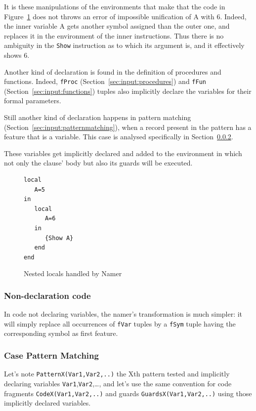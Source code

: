 \documentclass[a4paper]{memoir}
\begin{document}
It is these manipulations of the environments that make that the code in
Figure~\ref{fig:namer_nested_locals} does not throws an error of impossible
unification of A with 6. Indeed, the inner variable A gets another symbol
assigned than the outer one, and replaces it in the environment of the inner
instructions. Thus there is no ambiguity in the \lstinline!Show! instruction as
to which its argument is, and it effectively shows 6.

Another kind of declaration is found in the definition of procedures and
functions. Indeed, \lstinline!fProc! (Section~\ref{sec:input:procedures}) and
\lstinline!fFun! (Section~\ref{sec:input:functions}) tuples also implicitly
declare the variables for their formal parameters. %

Still another kind of declaration happens in pattern matching
(Section~\ref{sec:input:patternmatching}), when a record present in the pattern
has a feature that is a variable. This case is analysed specifically in
Section~\ref{sec:arch:namer:patternmatching}.

These variables get implicitly declared and added to the environment in which not only the clause' body but also its guards will be executed.


\begin{figure}
\begin{lstlisting}
local
   A=5
in
   local 
      A=6
   in
      {Show A}
   end
end
\end{lstlisting}
\caption{Nested locals handled by Namer}
\label{fig:namer_nested_locals}
\end{figure}


\subsubsection{Non-declaration code}
In code not declaring variables, the namer's transformation is much simpler: it will simply
replace all occurrences of \lstinline!fVar! tuples by a \lstinline!fSym! tuple having the corresponding symbol as first feature.


\subsubsection{Case Pattern Matching}\label{sec:arch:namer:patternmatching}
 Let's note
\lstinline!PatternX(Var1,Var2,..)! the Xth pattern tested and implicitly
declaring variables \lstinline!Var1!,\lstinline!Var2!,\ldots, and let's use the same convention for code fragments \lstinline!CodeX(Var1,Var2,..)! and guards \lstinline!GuardsX(Var1,Var2,..)! using those implicitly declared variables.
\end{document}
